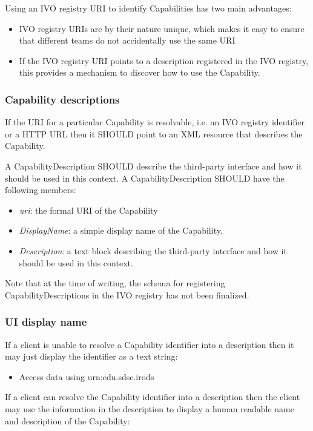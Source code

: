 \documentclass[11pt,a4paper]{ivoa}
\begin{document}
Using an IVO registry URI to identify Capabilities has two main advantages:

\begin{itemize}
    \item IVO registry URIs are by their nature unique, which makes it easy to ensure that different teams do not accidentally use the same URI
    \item If the IVO registry URI points to a description registered in the IVO registry, this provides a mechanism to discover how to use the Capability.
\end{itemize}

\subsubsection{Capability descriptions}
If the URI for a particular Capability is resolvable, i.e. an IVO registry identifier or a HTTP URL then it SHOULD point to an XML resource that describes the Capability.

A CapabilityDescription SHOULD describe the third-party interface and how it should be used in this context. A CapabilityDescription SHOULD have the following members:

\begin{itemize}
    \item \emph{uri}: the formal URI of the Capability
    \item \emph{DisplayName}: a simple display name of the Capability.
    \item \emph{Description}: a text block describing the third-party interface and how it should be used in this context.
\end{itemize}

Note that at the time of writing, the schema for registering CapabilityDescriptions in the IVO registry has not been finalized.

\subsubsection{UI display name}
If a client is unable to resolve a Capability identifier into a description then it may just display the identifier as a text string:

\begin{itemize}
    \item Access data using urn:edu.sdsc.irods
\end{itemize}

If a client can resolve the Capability identifier into a description then the client may use the information in the description to display a human readable name and description of the Capability:
\end{document}
